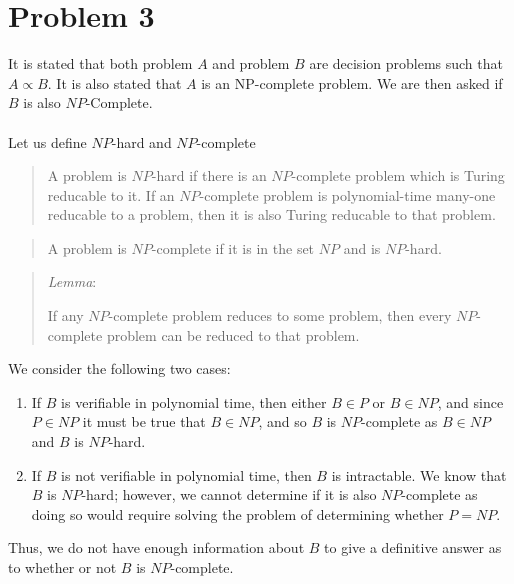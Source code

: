 \section*{Problem 3}

It is stated that both problem $A$ and problem $B$ are decision problems such that $A \propto B$. It is also stated that $A$ is an NP-complete problem. We are then asked if $B$ is also $NP$-Complete.
\\
\\
Let us define $NP$-hard and $NP$-complete
\\
\begin{quote}
    A problem is $NP$-hard if there is an $NP$-complete problem which is 
    Turing reducable to it. If an $NP$-complete problem is polynomial-time
    many-one reducable to a problem, then it is also Turing reducable to that
    problem.
\end{quote}
\begin{quote}
    A problem is $NP$-complete if it is in the set $NP$ and is $NP$-hard.
\end{quote}
\begin{quote}
    \textit{Lemma}:

    If any $NP$-complete problem reduces to some problem, then every 
    $NP$-complete problem can be reduced to that problem.
\end{quote}
%
We consider the following two cases: 
\begin{enumerate}
    \item If $B$ is verifiable in polynomial time, then either $B \in P$ or 
          $B \in NP$, and since $P \in NP$ it must be true that $B \in NP$, 
          and so $B$ is $NP$-complete as $B \in NP$ and $B$ is $NP$-hard.
    \item If $B$ is not verifiable in polynomial time, then $B$ is intractable.
          We know that $B$ is $NP$-hard; however, we cannot determine if it is 
          also $NP$-complete as doing so would require solving the problem of 
          determining whether $P = NP$.
\end{enumerate}
%
Thus, we do not have enough information about $B$ to give a definitive answer
as to whether or not $B$ is $NP$-complete.
